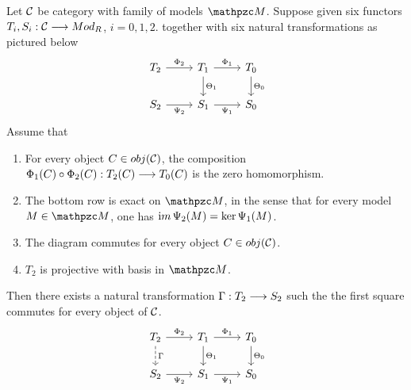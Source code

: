 \documentclass[11pt]{book} %
\begin{document}
\begin{lemma}\label{conj:lemma2}
Let ${\cal C}$ be category with family of models $\pzm$. Suppose given six functors
$T_i,S_i:{\cal C}\longrightarrow Mod_R$, $i=0,1,2$. together with six natural transformations as pictured below
\[
\begin{tikzcd}
T_2 \arrow[r, "\Phi_2"] & T_1 \arrow[r, "\Phi_1"] \arrow[d, "\Theta_1"] & T_0 \arrow[d, "\Theta_0"] \\
S_2 \arrow[r, "\Psi_2"'] & S_1 \arrow[r, "\Psi_1"'] & S_0
\end{tikzcd}
\]
Assume that 
\begin{enumerate}
	\item For every object $C\in obj({\cal C})$, the composition $\Phi_1(C)\circ \Phi_2(C):T_2(C)\longrightarrow T_0(C)$ is the zero homomorphism.
	\item The bottom row is exact on $\pzm$, in the sense that for every model $M\in\pzm$, one has ${\text im\thinspace} \Psi_2(M)=\ker \Psi_1(M)$.
	\item The diagram commutes for every object $C\in obj({\cal C})$.
	\item $T_2$ is projective with basis in $\pzm$.
\end{enumerate}
Then there exists a natural transformation $\Gamma:T_2\longrightarrow S_2$ such the the first square commutes for every object of ${\cal C}$.
\[
\begin{tikzcd}
T_2\ar[d, dashed, "\Gamma"] \arrow[r, "\Phi_2"] & T_1 \arrow[r, "\Phi_1"] \arrow[d, "\Theta_1"] & T_0 \arrow[d, "\Theta_0"] \\
S_2 \arrow[r, "\Psi_2"'] & S_1 \arrow[r, "\Psi_1"'] & S_0
\end{tikzcd}
\]
\end{lemma}
\end{document}
